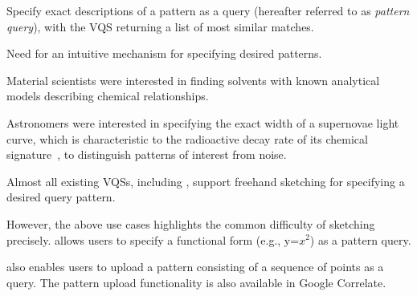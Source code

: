  Specify exact descriptions
of a pattern as a query
(hereafter referred to as \emph{pattern query}),
with the VQS returning a list of most similar matches.
\problemlist
  \item Need for an intuitive mechanism for specifying desired patterns.
  \item Material scientists were interested in finding solvents with known analytical models describing chemical relationships.
  \item Astronomers were interested in specifying the exact width of a supernovae light curve, which is characteristic to the radioactive decay rate of its chemical signature~\cite{Nugent1997}, to distinguish patterns of interest from noise.
\enumend
\featurelist
\item Almost all existing VQSs, including \zvpp, support freehand sketching for specifying a desired query pattern. %
\item However, the above use cases highlights the common difficulty of sketching precisely. \zvpp allows users to specify a functional form (e.g., y=$x^2$) as a pattern query.
\item \zvpp also enables users to upload a pattern consisting of a sequence of points as a query. The pattern upload functionality is also available in Google Correlate.
\enumend
